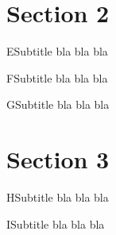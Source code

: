 \documentclass[aspectratio=1610]{beamer}
\begin{document}
\section{Section 2}

\begin{frame}{E}{Subtitle}
  bla bla bla
\end{frame}

\begin{frame}{F}{Subtitle}
  bla bla bla
\end{frame}

\begin{frame}{G}{Subtitle}
  bla bla bla
\end{frame}

\section{Section 3}

\begin{frame}{H}{Subtitle}
  bla bla bla
\end{frame}

\begin{frame}{I}{Subtitle}
  bla bla bla
\end{frame}
 
\end{document}
